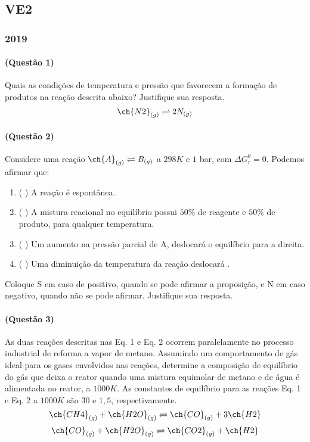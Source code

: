 \documentclass[12pt,a4paper]{article}
\begin{document}
\subsection{VE2}
\subsubsection{2019}

\paragraph{(Questão 1)}

Quais as condições de temperatura e pressão que favorecem a formação de produtos na reação descrita abaixo? Justifique sua resposta.
$$\ch{N2}_{(g)}     \rightleftharpoons 2N_{(g)}$$


\paragraph{(Questão 2)}

Considere uma reação $\ch{A}_{(g)}  \rightleftharpoons B_{(g)}$ a $298K$ e $1$ bar, com $ \Delta G^{\theta}_{r} = 0 $. Podemos afirmar que:

\begin{enumerate}[label=\alph*.]
    \item ( ) A reação é espontânea.
    \item ( ) A mistura reacional no equilíbrio possui $50\%$ de reagente e $50\%$ de produto, para qualquer temperatura.
    \item ( ) Um aumento na pressão parcial de A, deslocará o equilíbrio para a direita.
    \item ( ) Uma diminuição da temperatura da reação deslocará .
\end{enumerate}

Coloque S em caso de positivo, quando se pode afirmar a proposição, e N em caso negativo, quando não se pode afirmar. Justifique sua resposta.  

\paragraph{(Questão 3)}

As duas reações descritas nas Eq. 1 e Eq. 2 ocorrem paralelamente no processo industrial de reforma a vapor de metano. Assumindo um comportamento de gás ideal para os gases envolvidos nas reações, determine a composição de equilíbrio do gás que deixa o reator quando uma mistura equimolar de metano e de água é alimentada no reator, a $1000K$. As constantes de equilíbrio para as reações Eq. 1 e Eq. 2 a $1000K$ são $30$ e $1,5$, respectivamente.
$$ \ch{CH4}_{(g)} + \ch{H2O}_{(g)}  \rightleftharpoons \ch{CO}_{(g)} + 3\ch{H2} $$
$$ \ch{CO}_{(g)} + \ch{H2O}_{(g)}   \rightleftharpoons \ch{CO2}_{(g)} + \ch{H2} $$
\end{document}
